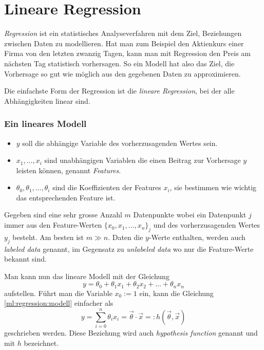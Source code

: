 %
%
%
%

\section{Lineare Regression\label{ml:regression}}

\emph{Regression} ist ein statistisches Analyseverfahren mit dem Ziel, Beziehungen zwischen
Daten zu modellieren. Hat man zum Beispiel den Aktienkurs einer Firma von den letzten zwanzig
Tagen, kann man mit Regression den Preis am nächsten Tag statistisch vorhersagen.
So ein Modell hat also das Ziel, die Vorhersage so gut wie möglich aus den gegebenen Daten zu approximieren.

Die einfachste Form der Regression ist die \emph{lineare Regression}, bei der alle Abhängigkeiten linear
sind.

\subsubsection{Ein lineares Modell}
\begin{itemize}
    \item $y$ soll die abhängige Variable des vorherzusagenden Wertes sein.
    \item $x_1, \dots, x_i$ sind unabhängigen Variablen die einen Beitrag zur Vorhersage
    $y$ leisten können, genannt \emph{Features}.
    \item $\theta_0, \theta_1, \dots, \theta_i$ sind die Koeffizienten der Features $x_i$,
    sie bestimmen wie wichtig das entsprechenden Feature ist.
\end{itemize}

Gegeben sind eine sehr grosse Anzahl $m$ Datenpunkte wobei ein Datenpunkt $j$ immer aus
den Feature-Werten $\{ x_0, x_1, \dots, x_n \}_j$ und des vorherzusagenden Wertes $y_j$ besteht.
Am besten ist $m \gg n$. Daten die $y$-Werte enthalten, werden auch \emph{labeled data} genannt,
im Gegensatz zu \emph{unlabeled data} wo nur die Feature-Werte bekannt sind.

Man kann nun das lineare Modell mit der Gleichung
\begin{equation}
y = \theta_0 + \theta_1 x_1 + \theta_2 x_2 + \dots + \theta_n x_n
\label{ml:regression:modell}
\end{equation}
aufstellen. Führt man die Variable $x_0 := 1$ ein, kann die Gleichung
\ref{ml:regression:modell} einfacher als
\begin{equation}
y = \sum_{i = 0}^{n} \theta_i x_i = \vec \theta \cdot \vec x =: h(\vec\theta, \vec x)
\label{ml:regression:hypothesis}
\end{equation}
geschrieben werden. Diese Beziehung wird auch \emph{hypothesis function} genannt und mit
$h$ bezeichnet.

